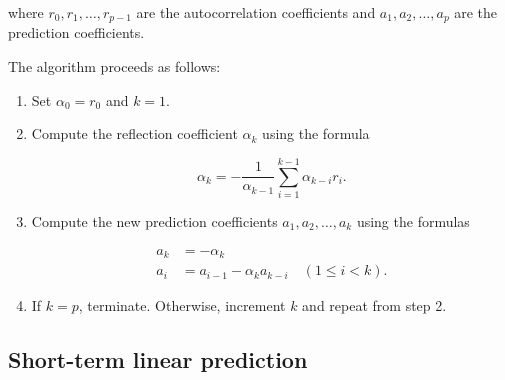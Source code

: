 where $r_0, r_1, \ldots, r_{p-1}$ are the autocorrelation coefficients and $a_1, a_2, \ldots, a_p$ are the prediction coefficients.

The algorithm proceeds as follows:

\begin{enumerate}
    \item Set $\alpha_0 = r_0$ and $k = 1$.
    \item Compute the reflection coefficient $\alpha_k$ using the formula

    \begin{equation*}
        \alpha_k = -\frac{1}{\alpha_{k-1}} \sum_{i=1}^{k-1} \alpha_{k-i} r_i.
    \end{equation*}

    \item Compute the new prediction coefficients $a_1, a_2, \ldots, a_k$ using the formulas

    \begin{align*}
        a_k &= -\alpha_k \\
        a_i &= a_{i-1} - \alpha_k a_{k-i} \quad (1 \leq i < k).
    \end{align*}

    \item If $k = p$, terminate. Otherwise, increment $k$ and repeat from step 2.
\end{enumerate}

\subsection{Short-term linear prediction} \label{subsec:shortlp}

